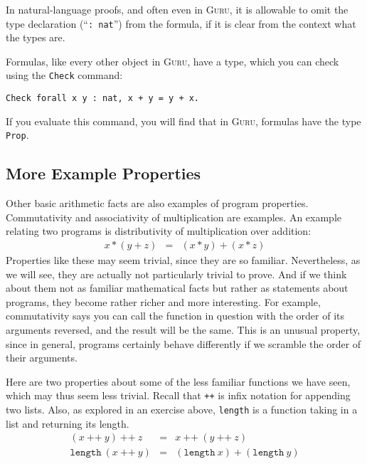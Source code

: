 \documentclass{book}[12pt]
\newcommand{\guru}[0]{\textsc{Guru}}
\begin{document}
\noindent In natural-language proofs, and often even in \guru, it is
allowable to omit the type declaration (``\texttt{: nat}'') from the
formula, if it is clear from the context what the types are.

Formulas, like every other object in \guru, have a type, which you can
check using the \texttt{Check} command:

\begin{verbatim}
Check forall x y : nat, x + y = y + x.
\end{verbatim}

\noindent If you evaluate this command, you will find that in \guru,
formulas have the type \texttt{Prop}.  

\subsection{More Example Properties}

Other basic arithmetic facts are also examples of program properties.
Commutativity and associativity of multiplication are examples.  An
example relating two programs is distributivity of multiplication over
addition:
\begin{eqnarray*}
x * (y + z) & = & (x * y) + (x * z)
\end{eqnarray*}
\noindent Properties like these may seem trivial, since they are so
familiar.  Nevertheless, as we will see, they are actually not
particularly trivial to prove.  And if we think about them not as
familiar mathematical facts but rather as statements about programs,
they become rather richer and more interesting.  For example,
commutativity says you can call the function in question with the
order of its arguments reversed, and the result will be the same.
This is an unusual property, since in general, programs certainly
behave differently if we scramble the order of their arguments.

Here are two properties about some of the less familiar functions we
have seen, which may thus seem less trivial.  Recall that \texttt{++} is
infix notation for appending two lists.  Also, as explored in an
exercise above, \texttt{length} is a function taking in a list and
returning its length.
\begin{eqnarray*}
(x\ \texttt{++}\ y)\ \texttt{++}\ z & = & x\ \texttt{++}\ (y\ \texttt{++}\ z)\\
\texttt{length}\ (x\ \texttt{++}\ y) & = & 
  (\texttt{length}\ x) + (\texttt{length}\ y)
\end{eqnarray*}
\end{document}
